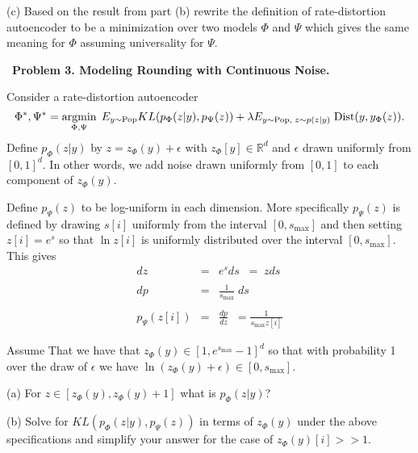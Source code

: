 \documentclass{article}
\newcommand{\solution}[1]{\bigskip {\color{red} {\bf Solution}: #1}}
\begin{document}
\medskip
(c) Based on the result from part (b) rewrite the definition of rate-distortion autoencoder to be a minimization over two models
$\Phi$ and $\Psi$ which gives the same meaning for $\Phi$ assuming universality for $\Psi$.

\solution{
  $$\Phi^*, \Psi^* = \argmin_{\Phi,\Psi} E_{y \sim \popd, z\sim P_\Phi(z|y)}\; \ln \frac{p_\Phi(z|y)}{p_\Psi(z)} + \lambda\;\mathrm{Dist}(y,y_\Phi(z)).$$
}

\bigskip
~{\bf Problem 3. Modeling Rounding with Continuous Noise.}
    
Consider a rate-distortion autoencoder
$$\Phi^*,\Psi^*  = \operatorname*{argmin}_{\Phi,\Psi}\;E_{y \sim \mathrm{Pop}} KL(p_\Phi(z|y),p_\Psi(z)) + \lambda E_{y \sim \mathrm{Pop},\;z \sim p(z|y)}\;\mathrm{Dist}(y,y_\Phi(z)).$$
Define $p_\Phi(z|y)$ by $z = z_\Phi(y) + \epsilon$ with $z_\Phi[y] \in \mathbb{R}^d$
and $\epsilon$ drawn uniformly from $[0,1]^d$. In other words,
we add noise drawn uniformly from $[0,1]$ to each component of $z_\Phi(y)$.

\medskip
Define $p_\Psi(z)$ to be log-uniform in each dimension.  More specifically
$p_\Psi(z)$ is defined by drawing $s[i]$ uniformly from the interval
$[0,s_{\mathrm{max}}]$ and then setting $z[i] = e^s$ so that $\ln z[i]$ is uniformly distributed over the interval $[0,s_{\mathrm{max}}]$.
This gives
\begin{eqnarray*}
  dz & = & e^sds  \;\;= \;zds\\
  \\
  dp & = & \frac{1}{s_{\mathrm{max}}}\;ds \\
  \\
  p_\Psi(z[i]) & = & \frac{dp}{dz} \;\;= \frac{1}{s_{\mathrm{max}}z[i]}
\end{eqnarray*}

\medskip
Assume That we have that $z_\Phi(y) \in [1,e^{s_{\mathrm{max}}}-1]^d$ so that with probability 1 over the draw of $\epsilon$ we have
$\ln(z_\Phi(y) + \epsilon) \in [0,s_{\mathrm{max}}]$.

\medskip
(a) For $z \in [z_\Phi(y),z_\Phi(y)+1]$ what is $p_\Phi(z|y)$?

\solution{1}

\medskip
(b) Solve for $KL(p_\Phi(z|y),p_\Psi(z))$ in terms of $z_\Phi(y)$ under the above specifications and simplify your answer
for the case of $z_\Phi(y)[i] >> 1$.
\end{document}
